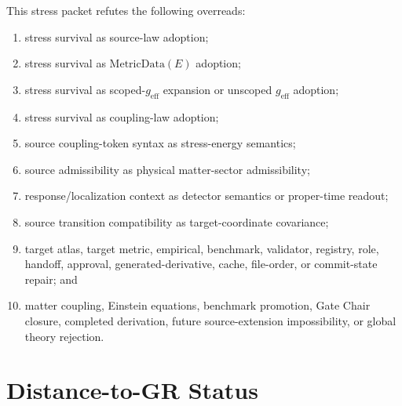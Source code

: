 \documentclass[11pt]{article}
\newcommand{\geff}{g_{\mathrm{eff}}}
\newcommand{\MetricData}{\mathrm{MetricData}}
\begin{document}
This stress packet refutes the following overreads:
\begin{enumerate}[leftmargin=*]
  \item stress survival as source-law adoption;
  \item stress survival as \(\MetricData(E)\) adoption;
  \item stress survival as scoped-\(\geff\) expansion or unscoped
  \(\geff\) adoption;
  \item stress survival as coupling-law adoption;
  \item source coupling-token syntax as stress-energy semantics;
  \item source admissibility as physical matter-sector admissibility;
  \item response/localization context as detector semantics or proper-time
  readout;
  \item source transition compatibility as target-coordinate covariance;
  \item target atlas, target metric, empirical, benchmark, validator,
  registry, role, handoff, approval, generated-derivative, cache, file-order,
  or commit-state repair; and
  \item matter coupling, Einstein equations, benchmark promotion, Gate Chair
  closure, completed derivation, future source-extension impossibility, or
  global theory rejection.
\end{enumerate}

\section{Distance-to-GR Status}
\end{document}
